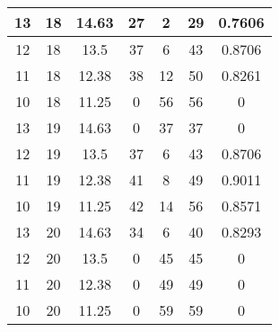 \documentclass[letterpaper, 12pt]{article}
\begin{document}
\begin{longtable}{|c|c|c|c|c|c|c|}
\hline
13 & 18 & 14.63 & 27 & 2 & 29 & 0.7606 \\
\hline
12 & 18 & 13.5 & 37 & 6 & 43 & 0.8706 \\
\hline
11 & 18 & 12.38 & 38 & 12 & 50 & 0.8261 \\
\hline
10 & 18 & 11.25 & 0 & 56 & 56 & 0 \\
\hline
13 & 19 & 14.63 & 0 & 37 & 37 & 0 \\
\hline
12 & 19 & 13.5 & 37 & 6 & 43 & 0.8706 \\
\hline
11 & 19 & 12.38 & 41 & 8 & 49 & 0.9011 \\
\hline
10 & 19 & 11.25 & 42 & 14 & 56 & 0.8571 \\
\hline
13 & 20 & 14.63 & 34 & 6 & 40 & 0.8293 \\
\hline
12 & 20 & 13.5 & 0 & 45 & 45 & 0 \\
\hline
11 & 20 & 12.38 & 0 & 49 & 49 & 0 \\
\hline
10 & 20 & 11.25 & 0 & 59 & 59 & 0 \\
\hline
\end{longtable}
\end{document}
